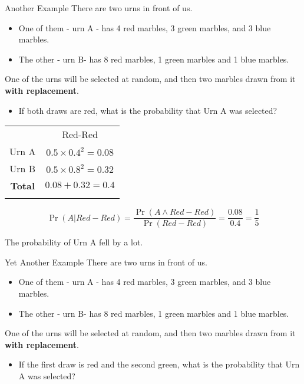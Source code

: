 \documentclass[
  ignorenonframetext,
]{beamer}
\providecommand{\tightlist}{%
  \setlength{\itemsep}{0pt}\setlength{\parskip}{0pt}}
\renewcommand{\,}{\text{, }}
\begin{document}
\begin{frame}{Another Example}
\protect\hypertarget{another-example}{}
There are two urns in front of us.

\begin{itemize}
\tightlist
\item
  One of them - urn A - has 4 red marbles, 3 green marbles, and 3 blue
  marbles.
\item
  The other - urn B- has 8 red marbles, 1 green marbles and 1 blue
  marbles. \pause
\end{itemize}

One of the urns will be selected at random, and then two marbles drawn
from it \textbf{with replacement}.

\begin{itemize}
\tightlist
\item
  If both draws are red, what is the probability that Urn A was
  selected?
\end{itemize}
\end{frame}

\begin{frame}
\begin{longtable}[]{@{}cc@{}}
\toprule
& Red-Red \\ \addlinespace
\midrule
\endhead
Urn A & \(0.5 \times 0.4^2 = 0.08\) \\ \addlinespace
Urn B & \(0.5 \times 0.8^2 = 0.32\) \\ \addlinespace
\textbf{Total} & \(0.08 + 0.32 = 0.4\) \\ \addlinespace
\bottomrule
\end{longtable}

\[
\Pr(A | Red-Red) = \frac{\Pr(A \wedge Red-Red)}{\Pr(Red-Red)} = \frac{0.08}{0.4} = \frac{1}{5}
\]

\bigskip

The probability of Urn A fell by a lot.
\end{frame}

\begin{frame}{Yet Another Example}
\protect\hypertarget{yet-another-example}{}
There are two urns in front of us.

\begin{itemize}
\tightlist
\item
  One of them - urn A - has 4 red marbles, 3 green marbles, and 3 blue
  marbles.
\item
  The other - urn B- has 8 red marbles, 1 green marbles and 1 blue
  marbles. \pause
\end{itemize}

One of the urns will be selected at random, and then two marbles drawn
from it \textbf{with replacement}.

\begin{itemize}
\tightlist
\item
  If the first draw is red and the second green, what is the probability
  that Urn A was selected?
\end{itemize}
\end{frame}
\end{document}

